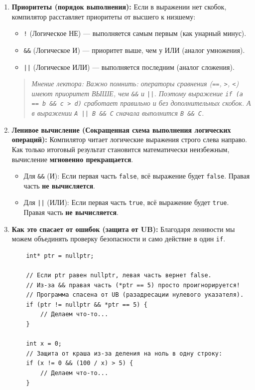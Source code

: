 \documentclass[a4paper, 12pt]{article}
\newcommand{\term}[1]{\textbf{#1}} %
\newcommand{\code}[1]{\texttt{#1}} %
\newcommand{\barchevnote}[1]{\begin{quote}\small\itshape Мнение лектора: #1\end{quote}}
\begin{document}
\begin{enumerate}
    \item \term{Приоритеты (порядок выполнения):}
    Если в выражении нет скобок, компилятор расставляет приоритеты от высшего к низшему:
    \begin{itemize}
        \item \code{!} (Логическое НЕ) --- выполняется самым первым (как унарный минус).
        \item \code{\&\&} (Логическое И) --- приоритет выше, чем у ИЛИ (аналог умножения).
        \item \code{||} (Логическое ИЛИ) --- выполняется последним (аналог сложения).
    \end{itemize}
    
    \barchevnote{Важно помнить: операторы сравнения (\code{==}, \code{>}, \code{<}) имеют приоритет ВЫШЕ, чем \code{\&\&} и \code{||}. Поэтому выражение \code{if (a == b \&\& c > d)} сработает правильно и без дополнительных скобок. А в выражении \code{A || B \&\& C} сначала выполнится \code{B \&\& C}.}

    \item \term{Ленивое вычисление (Сокращенная схема выполнения логических операций):}
    Компилятор читает логические выражения строго слева направо. Как только итоговый результат становится математически неизбежным, вычисление \textbf{мгновенно прекращается}.
    
    \begin{itemize}
        \item Для \code{\&\&} (И): Если первая часть \code{false}, всё выражение будет \code{false}. Правая часть \textbf{не вычисляется}.
        \item Для \code{||} (ИЛИ): Если первая часть \code{true}, всё выражение будет \code{true}. Правая часть \textbf{не вычисляется}.
    \end{itemize}

    \item \term{Как это спасает от ошибок (защита от UB):}
    Благодаря ленивости мы можем объединять проверку безопасности и само действие в один \code{if}.
    
    \begin{verbatim}
    int* ptr = nullptr;
    
    // Если ptr равен nullptr, левая часть вернет false.
    // Из-за && правая часть (*ptr == 5) просто проигнорируется!
    // Программа спасена от UB (разадресации нулевого указателя).
    if (ptr != nullptr && *ptr == 5) {
        // Делаем что-то...
    }

    int x = 0;
    // Защита от краша из-за деления на ноль в одну строку:
    if (x != 0 && (100 / x) > 5) {
        // Делаем что-то...
    }
    \end{verbatim}
\end{enumerate}
\end{document}
